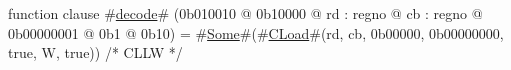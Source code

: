 function clause #\hyperref[zdecode]{decode}# (0b010010 @ 0b10000 @ rd : regno @ cb : regno @ 0b00000001 @ 0b1 @ 0b10) = #\hyperref[zSome]{Some}#(#\hyperref[zCLoad]{CLoad}#(rd, cb, 0b00000, 0b00000000, true,  W, true)) /* CLLW  */
